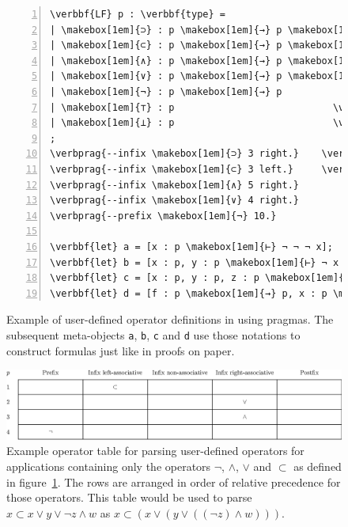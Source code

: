 \begin{figure}[htb]
\begin{Verbatim}[commandchars=\\\{\}, baselinestretch=1, numbers=left]
\verbbf{LF} p : \verbbf{type} =
| \makebox[1em]{⊃} : p \makebox[1em]{→} p \makebox[1em]{→} p                  \verbcomment{% Logical implication}
| \makebox[1em]{⊂} : p \makebox[1em]{→} p \makebox[1em]{→} p                  \verbcomment{% Converse implication}
| \makebox[1em]{∧} : p \makebox[1em]{→} p \makebox[1em]{→} p                  \verbcomment{% Logical conjunction}
| \makebox[1em]{∨} : p \makebox[1em]{→} p \makebox[1em]{→} p                  \verbcomment{% Logical disjunction}
| \makebox[1em]{¬} : p \makebox[1em]{→} p                       \verbcomment{% Logical negation}
| \makebox[1em]{⊤} : p                            \verbcomment{% Tautology}
| \makebox[1em]{⊥} : p                            \verbcomment{% Contradiction}
;
\verbprag{--infix \makebox[1em]{⊃} 3 right.}    \verbcomment{% Subsequently treat ⊃ as a right-associative}
\verbprag{--infix \makebox[1em]{⊂} 3 left.}     \verbcomment{% infix operator with precedence value 3}
\verbprag{--infix \makebox[1em]{∧} 5 right.}
\verbprag{--infix \makebox[1em]{∨} 4 right.}
\verbprag{--prefix \makebox[1em]{¬} 10.}

\verbbf{let} a = [x : p \makebox[1em]{⊢} ¬ ¬ ¬ x];
\verbbf{let} b = [x : p, y : p \makebox[1em]{⊢} ¬ x ⊂ y ⊂ ⊥];
\verbbf{let} c = [x : p, y : p, z : p \makebox[1em]{⊢} ⊤ ∨ x ∧ ¬ y ⊃ ¬ z];
\verbbf{let} d = [f : p \makebox[1em]{→} p, x : p \makebox[1em]{⊢} ¬ f x ∨ f ⊥];
\end{Verbatim}
\caption[Example of user-defined operator definitions in \Beluga using pragmas]{%
Example of user-defined operator definitions in \Beluga using pragmas.
The subsequent meta-objects \texttt{a}, \texttt{b}, \texttt{c} and \texttt{d} use those notations to construct formulas just like in proofs on paper.
}
\label{figure:operator-pragmas}
\end{figure}

\begin{figure}[htb]
\includegraphics[width=\textwidth]{figures/operator-table.eps}
\caption[Example operator table for parsing user-defined operators]{%
Example operator table for parsing user-defined operators for applications containing only the operators $\lnot$, $\land$, $\lor$ and $\subset$ as defined in figure~\ref{figure:operator-pragmas}.
The rows are arranged in order of relative precedence for those operators.
This table would be used to parse $x \subset x \lor y \lor \lnot z \land w$ as $x \subset (x \lor (y \lor ((\lnot z) \land w)))$.
}
\label{figure:operator-table}
\end{figure}

